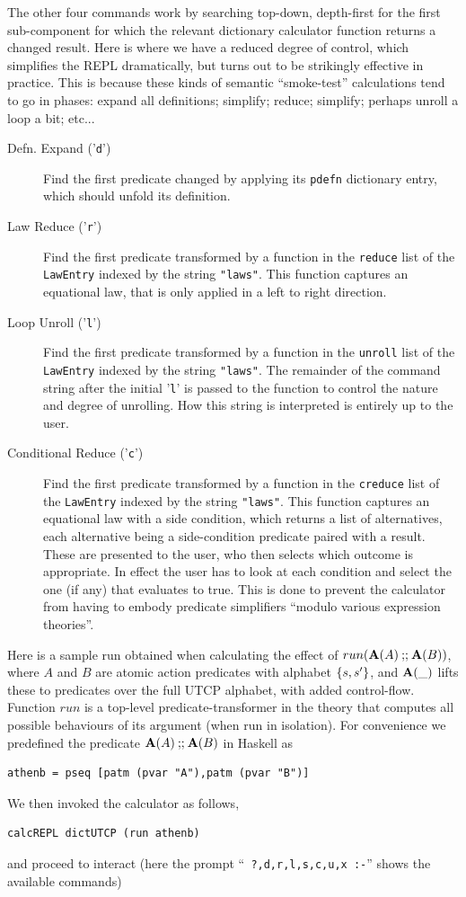 The other four commands work by searching top-down, depth-first for
the first sub-component for which the relevant dictionary calculator
function returns a changed result.
Here is where we have a reduced degree of control,
which simplifies the REPL dramatically,
but turns out to be strikingly effective in practice.
This is because these kinds of semantic ``smoke-test'' calculations
tend to go in phases: expand all definitions; simplify; reduce; simplify;
perhaps unroll a loop a bit; etc...
\begin{description}
  \item[Defn. Expand ('\texttt{d}')]
    Find the first predicate changed by applying its
     \texttt{pdefn} dictionary entry, which should unfold its definition.
  \item[Law Reduce ('\texttt{r}')]
    Find the first predicate transformed by a function
    in the \texttt{reduce} list of the \texttt{LawEntry} indexed
     by the string \texttt{"laws"}.
     This function captures an equational law,
     that is only applied in a left to right direction.
  \item[Loop Unroll ('\texttt{l}')]
    Find the first predicate transformed by a function
    in the \texttt{unroll} list of the \texttt{LawEntry} indexed
     by the string \texttt{"laws"}.
    The remainder of the command string after the initial '\texttt{l}'
    is passed to the function to control the nature and degree
    of unrolling. How this string is interpreted is entirely
    up to the user.
  \item[Conditional Reduce ('\texttt{c}')]
    Find the first predicate transformed by a function
    in the \texttt{creduce} list of the \texttt{LawEntry} indexed
     by the string \texttt{"laws"}.
     This function captures an equational law with a side condition,
    which returns a list of alternatives,
    each alternative being a side-condition predicate
    paired with a result.
    These are presented to the user,
    who then selects which outcome is appropriate.
    In effect the user has to look at each condition
    and select the one (if any) that evaluates to true.
    This is done to prevent the calculator from having
    to embody predicate simplifiers ``modulo various expression theories''.
\end{description}


Here is a sample run obtained when calculating the effect of $run(\mathbf{A}(A) \mathbin{\mathbf{;\!;}} \mathbf{A}(B))$,
where $A$ and $B$ are atomic action predicates with alphabet $\{{s,s'}\}$,
and $\mathbf{A}(\_)$ lifts these to predicates over the full UTCP alphabet,
with added control-flow.
Function $run$ is a top-level predicate-transformer in the theory that computes
all possible behaviours of its argument (when run in isolation).
For convenience we predefined the predicate $\mathbf{A}(A) \mathbin{\mathbf{;\!;}} \mathbf{A}(B)$ in Haskell as
\begin{verbatim}
athenb = pseq [patm (pvar "A"),patm (pvar "B")]
\end{verbatim}
We then invoked the calculator as follows,
\begin{verbatim}
calcREPL dictUTCP (run athenb)
\end{verbatim}
and proceed to interact
(here the prompt  ``\texttt{ ?,d,r,l,s,c,u,x :-}''
shows the available commands)

